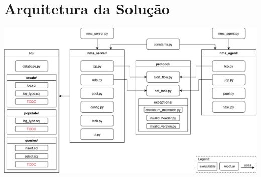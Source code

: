 \documentclass[a4paper,12pt]{scrreprt}
\begin{document}
\pagebreak



\renewcommand{\contentsname}{Índice}
\renewcommand{\listfigurename}{Índice de Figuras}
\renewcommand{\lstlistlistingname}{Índice de \textit{Snippets}}

\tableofcontents
\pagebreak

\listoffigures
\pagebreak

\lstlistoflistings
\pagebreak




\chapter{Arquitetura da Solução}

\begin{minipage}{\textwidth}
    \centering
    \includegraphics[width=\textwidth]{img/architecture.png}
    \label{fig:architecture}
\end{minipage}
\end{document}
